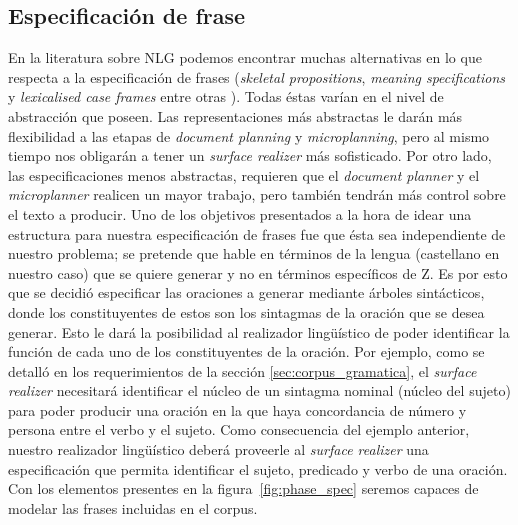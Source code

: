 \subsection{Especificación de frase}

En la literatura sobre NLG podemos encontrar muchas alternativas en lo que respecta a la especificación de frases (\textit{skeletal propositions}, \textit{meaning specifications} y \textit{lexicalised case frames} entre otras \cite{reiter_dale}). Todas éstas varían en el nivel de abstracción que poseen. Las representaciones más abstractas le darán más flexibilidad a las etapas de \textit{document planning} y \textit{microplanning}, pero al mismo tiempo nos obligarán a tener un \textit{surface realizer} más sofisticado. Por otro lado, las especificaciones menos abstractas, requieren que el \textit{document planner} y el \textit{microplanner} realicen un mayor trabajo, pero también tendrán más control sobre el texto a producir. Uno de los objetivos presentados a la hora de idear una estructura para nuestra especificación de frases fue que ésta sea independiente de nuestro problema; se pretende que hable en términos de la lengua (castellano en nuestro caso) que se quiere generar y no en términos específicos de Z. Es por esto que se decidió especificar las oraciones a generar mediante árboles sintácticos, donde los constituyentes de estos son los sintagmas de la oración que se desea generar. Esto le dará la posibilidad al realizador lingüístico de poder identificar la función de cada uno de los constituyentes de la oración. Por ejemplo, como se detalló en los requerimientos de la sección \ref{sec:corpus_gramatica}, el \textit{surface realizer} necesitará identificar el núcleo de un sintagma nominal (núcleo del sujeto) para poder producir una oración en la que haya concordancia de número y persona entre el verbo y el sujeto. Como consecuencia del ejemplo anterior, nuestro realizador lingüístico deberá proveerle al \textit{surface realizer} una especificación que permita identificar el sujeto, predicado y verbo de una oración. Con los elementos presentes en la figura~\ref{fig:phase_spec} seremos capaces de modelar las frases incluidas en el corpus.

